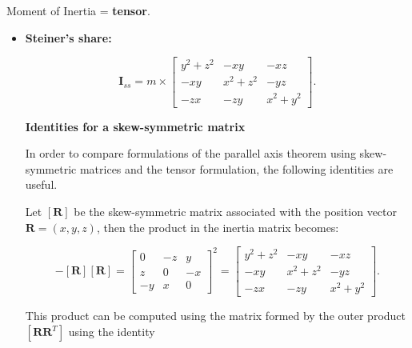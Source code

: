 Moment of Inertia = \textbf{tensor}.

\begin{itemize}
    \item \textbf{Steiner's share:}

        \begin{equation}
            \mathbf{I}_{ss} = m \times \begin{bmatrix}
                y^{2} + z^{2} & -xy & -xz \\
                -xy & x^{2} + z^{2} & -yz \\
                -zx & -zy & x^{2} + y^{2}
            \end{bmatrix}
        .\end{equation}

        \textbf{Identities for a skew-symmetric matrix}

        In order to compare formulations of the parallel axis theorem using
        skew-symmetric matrices and the tensor formulation, the following
        identities are useful.

        Let $[\mathbf{R}]$ be the skew-symmetric matrix associated with the
        position vector $\mathbf{R} = (x, y, z)$, then the product in
        the inertia matrix becomes:

        \begin{equation}
            -[\mathbf{R}][\mathbf{R}] = \begin{bmatrix}
                0 & -z & y \\
                z & 0 & -x \\
                -y & x & 0
            \end{bmatrix}^{2}
            = \begin{bmatrix}
                y^{2} + z^{2} & -xy & -xz \\
                -xy & x^{2} + z^{2} & -yz \\
                -zx & -zy & x^{2} + y^{2}
            \end{bmatrix}
        .\end{equation}

        This product can be computed using the matrix formed by the outer product
        $[\mathbf{R} \mathbf{R}^{T}]$ using the identity


\end{itemize}
